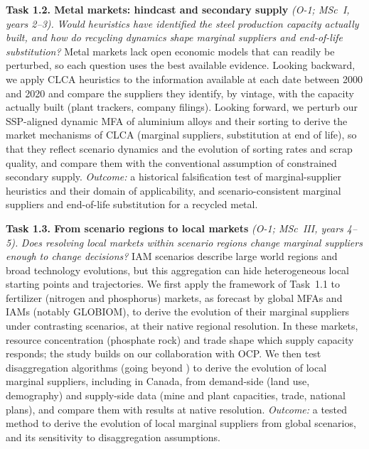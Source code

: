 \documentclass[compact]{nserc} %
\begin{document}
\noindent \textbf{Task 1.2. Metal markets: hindcast and secondary supply} \emph{(O-1; MSc~I, years 2--3).} \emph{Would heuristics have identified the steel production capacity actually built, and how do recycling dynamics shape marginal suppliers and end-of-life substitution?}
%
Metal markets lack open economic models that can readily be perturbed, so each question uses the best available evidence. Looking backward, we apply CLCA heuristics to the information available at each date between 2000 and 2020 and compare the suppliers they identify, by vintage, with the capacity actually built (plant trackers, company filings). Looking forward, we perturb our SSP-aligned dynamic MFA of aluminium alloys and their sorting to derive the market mechanisms of CLCA (marginal suppliers, substitution at end of life), so that they reflect scenario dynamics and the evolution of sorting rates and scrap quality, and compare them with the conventional assumption of constrained secondary supply. \emph{Outcome:} a historical falsification test of marginal-supplier heuristics and their domain of applicability, and scenario-consistent marginal suppliers and end-of-life substitution for a recycled metal.

\noindent \textbf{Task 1.3. From scenario regions to local markets} \emph{(O-1; MSc~III, years 4--5).} \emph{Does resolving local markets within scenario regions change marginal suppliers enough to change decisions?}
%
IAM scenarios describe large world regions and broad technology evolutions, but this aggregation can hide heterogeneous local starting points and trajectories. We first apply the framework of Task~1.1 to fertilizer (nitrogen and phosphorus) markets, as forecast by global MFAs and IAMs (notably GLOBIOM), to derive the evolution of their marginal suppliers under contrasting scenarios, at their native regional resolution. In these markets, resource concentration (phosphate rock) and trade shape which supply capacity responds; the study builds on our collaboration with OCP. We then test disaggregation algorithms (going beyond \textcite{sferraDSCALEV01Opensource2026}) to derive the evolution of local marginal suppliers, including in Canada, from demand-side (land use, demography) and supply-side data (mine and plant capacities, trade, national plans), and compare them with results at native resolution. \emph{Outcome:} a tested method to derive the evolution of local marginal suppliers from global scenarios, and its sensitivity to disaggregation assumptions.
\end{document}
